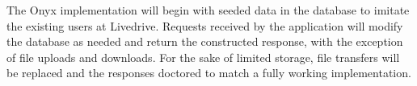 The Onyx implementation will begin with seeded data in the database to imitate the existing users at Livedrive. Requests received by the application will modify the database as needed and return the constructed response, with the exception of file uploads and downloads. For the sake of limited storage, file transfers will be replaced and the responses doctored to match a fully working implementation.